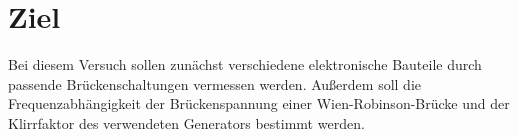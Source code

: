 \section{Ziel}
Bei diesem Versuch sollen zunächst verschiedene 
elektronische Bauteile durch passende
Brückenschaltungen vermessen werden.
Außerdem soll die Frequenzabhängigkeit der
Brückenspannung einer Wien-Robinson-Brücke und
der Klirrfaktor des verwendeten Generators bestimmt
werden.

